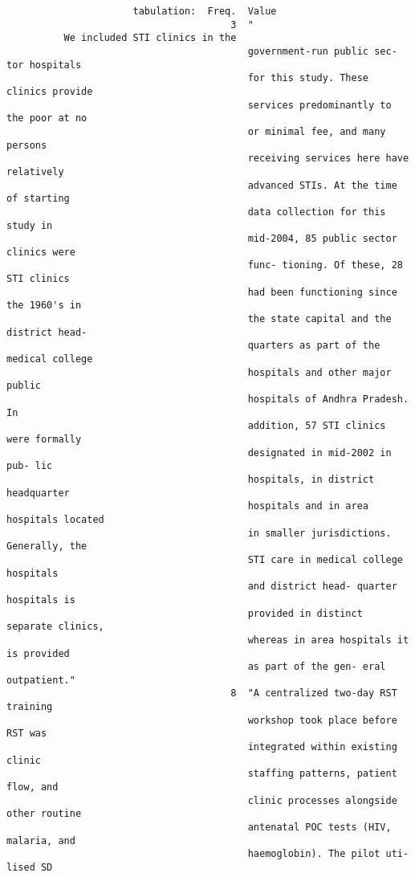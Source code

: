 \documentclass{article}
\begin{document}
\begin{verbatim}
                      tabulation:  Freq.  Value
                                       3  "
          We included STI clinics in the
                                          government-run public sec- tor hospitals
                                          for this study. These clinics provide
                                          services predominantly to the poor at no
                                          or minimal fee, and many persons
                                          receiving services here have relatively
                                          advanced STIs. At the time of starting
                                          data collection for this study in
                                          mid-2004, 85 public sector clinics were
                                          func- tioning. Of these, 28 STI clinics
                                          had been functioning since the 1960's in
                                          the state capital and the district head-
                                          quarters as part of the medical college
                                          hospitals and other major public
                                          hospitals of Andhra Pradesh. In
                                          addition, 57 STI clinics were formally
                                          designated in mid-2002 in pub- lic
                                          hospitals, in district headquarter
                                          hospitals and in area hospitals located
                                          in smaller jurisdictions. Generally, the
                                          STI care in medical college hospitals
                                          and district head- quarter hospitals is
                                          provided in distinct separate clinics,
                                          whereas in area hospitals it is provided
                                          as part of the gen- eral outpatient."
                                       8  "A centralized two-day RST training
                                          workshop took place before RST was
                                          integrated within existing clinic
                                          staffing patterns, patient flow, and
                                          clinic processes alongside other routine
                                          antenatal POC tests (HIV, malaria, and
                                          haemoglobin). The pilot uti- lised SD

\end{verbatim}
\end{document}
